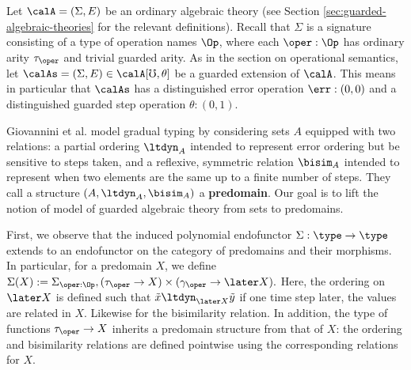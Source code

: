 \documentclass[acmsmall,screen,review,anonymous]{acmart}
\theoremstyle{remark}
\begin{document}
Let $\calA = (\Sigma, E)$ be an ordinary algebraic theory (see Section
\ref{sec:guarded-algebraic-theories} for the relevant definitions). Recall that
$\Sigma$ is a signature consisting of a type of operation names $\Op$, where
each $\oper : \Op$ has ordinary arity $\tau_\oper$ and trivial guarded arity.
%
As in the section on operational semantics, let $\calAs = (\Sigma, E) \in
\calA[\mho, \theta]$ be a guarded extension of $\calA$.
%
This means in particular that $\calAs$ has a distinguished error operation $\err
: (0, 0)$ and a distinguished guarded step operation $\theta : (0, 1)$.

Giovannini et al. model gradual typing by considering sets $A$
equipped with two relations: a partial ordering $\ltdyn_A$ intended to represent
error ordering but be sensitive to steps taken, and a reflexive, symmetric
relation $\bisim_A$ intended to represent when two elements are the same up to
a finite number of steps. They call a structure $(A, \ltdyn_A, \bisim_A)$ a
\textbf{predomain}. Our goal is to lift the notion of model of guarded algebraic
theory from sets to predomains.  

First, we observe that the induced polynomial endofunctor
$\Sigma : \type \to \type$ extends to an endofunctor on the category of
predomains and their morphisms. In particular, for a predomain $X$, we define
%
$\Sigma(X) := \Sigma_{\oper: \Op}, (\tau_\oper \to X) \times (\gamma_\oper \to \later X).$
%
Here, the ordering on $\later X$ is defined such that $\tilde{x} \ltdyn_{\later
X} \tilde{y}$ if one time step later, the values are related in $X$. Likewise
for the bisimilarity relation.
%
In addition, the type of functions $\tau_\oper \to X$ inherits a predomain
structure from that of $X$: the ordering and bisimilarity relations are defined
pointwise using the corresponding relations for $X$.

\end{document}
